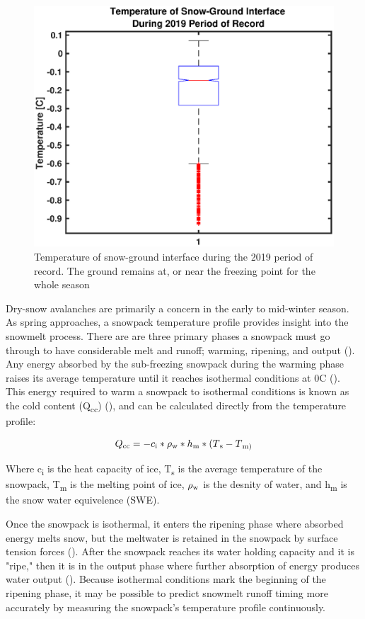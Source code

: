  \begin{figure}[!t]
    \centering
    \includegraphics[width=0.8\linewidth]{figures/TempGrad/GroundTemp.eps}
    \caption{Temperature of snow-ground interface during the 2019 period of record. The ground remains at, or near the freezing point for the whole season}
    \label{fig:GroundTemp}
 \end{figure}

Dry-snow avalanches are primarily a concern in the early to mid-winter season. As spring approaches, a snowpack temperature profile provides insight into the snowmelt process. There are are three primary phases a snowpack must go through to have considerable melt and runoff; warming, ripening, and output (\cite{dingman2015}). Any energy absorbed by the sub-freezing snowpack during the warming phase raises its average temperature until it reaches isothermal conditions at 0\textdegree C (\cite{dingman2015}). This energy required to warm a snowpack to isothermal conditions is known as the cold content (Q\textsubscript{cc}) (\cite{dingman2015}), and can be calculated directly from the temperature profile:

\begin{equation}
Q\textsubscript{cc} = -c\textsubscript{i}*\rho\textsubscript{w}*h\textsubscript{m}*(T\textsubscript{s}-T\textsubscript{m)}
\end{equation}

Where c\textsubscript{i} is the heat capacity of ice, T\textsubscript{s} is the average temperature of the snowpack, T\textsubscript{m} is the melting point of ice, $\rho\textsubscript{w}$ is the desnity of water, and h\textsubscript{m} is the snow water equivelence (SWE). 

Once the snowpack is isothermal, it enters the ripening phase where absorbed energy melts snow, but the meltwater is retained in the snowpack by surface tension forces (\cite{dingman2015}). After the snowpack reaches its water holding capacity and it is "ripe," then it is in the output phase where further absorption of energy produces water output (\cite{dingman2015}). Because isothermal conditions mark the beginning of the ripening phase, it may be possible to predict snowmelt runoff timing more accurately by measuring the snowpack's temperature profile continuously.

